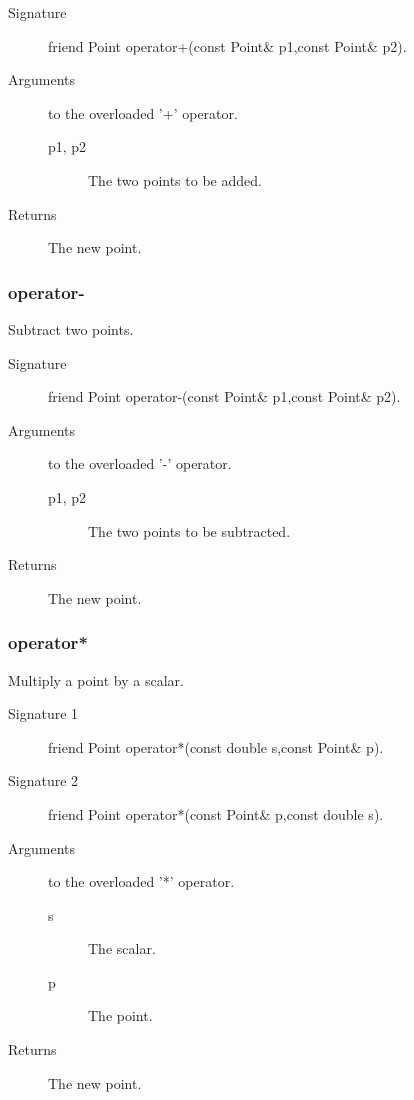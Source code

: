 \begin{description}
  \item[Signature] friend Point operator+(const Point\& p1,const
  Point\& p2).
  \item[Arguments] to the overloaded '+' operator.
    \begin{description}
      \item[p1, p2] The two points to be added. 
    \end{description}
  \item[Returns] The new point.
\end{description}

\subsubsection{operator-}
Subtract two points.
\begin{description}
  \item[Signature] friend Point operator-(const Point\& p1,const
  Point\& p2).
  \item[Arguments] to the overloaded '-' operator.
    \begin{description}
      \item[p1, p2] The two points to be subtracted. 
    \end{description}
  \item[Returns] The new point.
\end{description}

\subsubsection{operator*}
Multiply a point by a scalar.
\begin{description}
  \item[Signature 1] friend Point operator*(const double s,const Point\& p).
  \item[Signature 2] friend Point operator*(const Point\& p,const double s).
  \item[Arguments]  to the overloaded '*' operator.
     \begin{description}
        \item[s] The scalar.
        \item[p] The point.
     \end{description} 
  \item[Returns] The new point.
\end{description}

